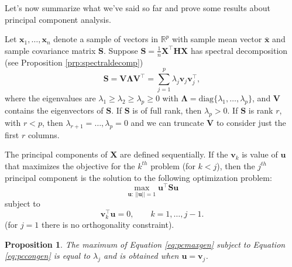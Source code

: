 \documentclass[]{book}
\newtheorem{proposition}{Proposition}[chapter]
\theoremstyle{definition}
\theoremstyle{definition}
\theoremstyle{definition}
\theoremstyle{remark}
\begin{document}
Let's now summarize what we've said so far and prove some results about principal component analysis.

Let \(\mathbf x_1, \ldots , \mathbf x_n\) denote a sample of vectors in \(\mathbb{R}^p\) with sample mean vector \(\bar{\mathbf x}\) and sample covariance matrix \(\mathbf S\). Suppose \(\mathbf S=\frac{1}{n}\mathbf X^\top \mathbf H\mathbf X\) has spectral decomposition (see Proposition \ref{prp:spectraldecomp})
\begin{equation}
\mathbf S=\mathbf V\boldsymbol \Lambda\mathbf V^\top = \sum_{j=1}^p  \lambda_j \mathbf v_j \mathbf v_j^\top,
\label{eq:pcaspect}
\end{equation}
where the eigenvalues are \(\lambda_1 \geq \lambda_2 \geq \lambda_p \geq 0\) with \(\boldsymbol \Lambda=\text{diag}\{\lambda_1, \ldots, \lambda_p\}\), and \(\mathbf V\) contains the eigenvectors of \(\mathbf S\). If \(\mathbf S\) is of full rank, then \(\lambda_p>0\). If \(\mathbf S\) is rank \(r\), with \(r<p\), then \(\lambda_{r+1}=\ldots, \lambda_p=0\) and we can truncate \(\mathbf V\) to consider just the first \(r\) columns.

The principal components of \(\mathbf X\) are defined sequentially. If the \(\mathbf v_k\) is value of \(\mathbf u\) that maximizes the objective for the \(k^{th}\) problem (for \(k<j\)), then the \(j^{th}\) principal component is the solution to the following optimization problem:
\begin{equation}
\max_{\mathbf u: \, \vert \vert \mathbf u\vert \vert =1}\mathbf u^\top \mathbf S\mathbf u
\label{eq:pcmaxgen}
\end{equation}
subject to
\begin{equation}
\mathbf v_k^\top \mathbf u=0, \qquad k=1, \ldots , j-1.
\label{eq:pccongen}
\end{equation}
(for \(j=1\) there is no orthogonality constraint).

\begin{proposition}
\protect\hypertarget{prp:pca1}{}{\label{prp:pca1} }The maximum of Equation \eqref{eq:pcmaxgen}
subject to Equation \eqref{eq:pccongen} is equal to \(\lambda_j\) and is obtained when \(\mathbf u=\mathbf v_j\).
\end{proposition}
\end{document}
